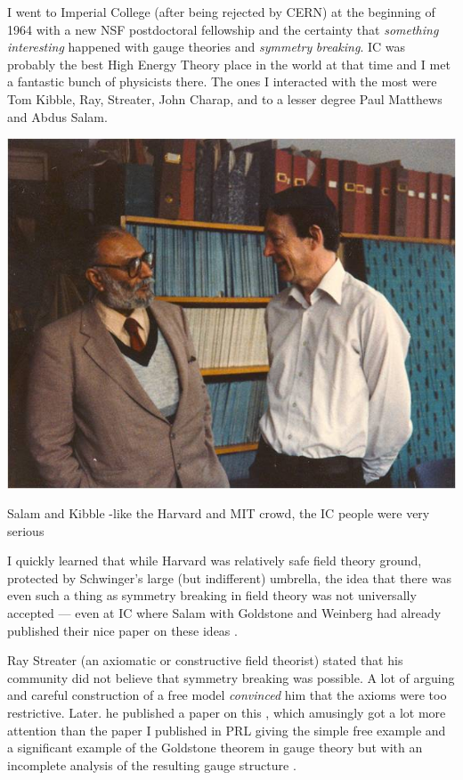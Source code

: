 \documentclass[preprintnumbers,12pt]{revtex4-2}
\begin{document}
I went to Imperial College (after being rejected by CERN) at the
beginning of 1964 with a new NSF postdoctoral fellowship and the
certainty that \emph{something} \emph{interesting} happened with
gauge theories and \emph{symmetry} \emph{breaking}. IC was probably
the best High Energy Theory place in the world at that time and I met
a fantastic bunch of physicists there. The ones I interacted with the
most were Tom Kibble, Ray, Streater, John Charap, and to a lesser
degree Paul Matthews and Abdus Salam.

\begin{center}
  \includegraphics[scale=0.6]{sk.jpg}

  Salam and Kibble -like the Harvard and MIT crowd, the IC people were very serious
\end{center}


I quickly learned that while Harvard was relatively safe field theory
ground, protected by Schwinger's large (but indifferent) umbrella, the
idea that there was even such a thing as symmetry breaking in field
theory was not universally accepted --- even at IC where Salam
with Goldstone and Weinberg had already published their nice paper on
these ideas \cite{gsw;1962}.

Ray Streater (an axiomatic or constructive field theorist) stated that
his community did not believe that symmetry breaking was possible. A
lot of arguing and careful construction of a free model
\emph{convinced} him that the axioms were too restrictive. Later. he
published a paper on this \cite{rs;1965}, which amusingly got a lot more attention
than the paper I published in PRL giving the simple free example and a
significant example of the Goldstone theorem in gauge theory but  with
an incomplete analysis of the resulting gauge structure \cite{ggfu;1964}.
\end{document}
